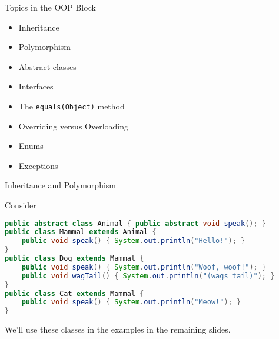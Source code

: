 \documentclass{beamer}
\begin{document}
\begin{frame}
  \titlepage
\end{frame}

\begin{frame}[fragile]{Topics in the OOP Block}


\begin{itemize}
\item Inheritance
\item Polymorphism
\item Abstract classes
\item Interfaces
\item The {\tt equals(Object)} method
\item Overriding versus Overloading
\item Enums
\item Exceptions
\end{itemize}


\end{frame}

\begin{frame}[fragile]{Inheritance and Polymorphism}


Consider
\begin{lstlisting}[language=Java]
public abstract class Animal { public abstract void speak(); }
public class Mammal extends Animal {
    public void speak() { System.out.println("Hello!"); }
}
public class Dog extends Mammal {
    public void speak() { System.out.println("Woof, woof!"); }
    public void wagTail() { System.out.println("(wags tail)"); }
}
public class Cat extends Mammal {
    public void speak() { System.out.println("Meow!"); }
}
\end{lstlisting}

We'll use these classes in the examples in the remaining slides.

\end{frame}
\end{document}
